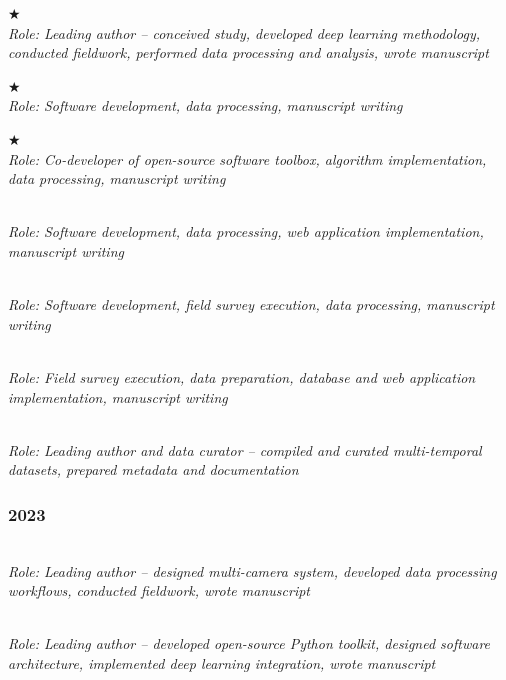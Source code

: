 \documentclass[11pt,a4paper]{article}
\newcommand{\starred}{\ensuremath{\bigstar}~}
\begin{document}
\noindent\starred{} \\
\textit{Role: Leading author -- conceived study, developed deep learning methodology, conducted fieldwork, performed data processing and analysis, wrote manuscript}

\vspace{8pt}
\noindent\starred{} \\
\textit{Role: Software development, data processing, manuscript writing}

\vspace{8pt}
\noindent\starred{} \\
\textit{Role: Co-developer of open-source software toolbox, algorithm implementation, data processing, manuscript writing}

\vspace{8pt}
\noindent{} \\
\textit{Role: Software development, data processing, web application implementation, manuscript writing}

\vspace{8pt}
\noindent{} \\
\textit{Role: Software development, field survey execution, data processing, manuscript writing}

\vspace{8pt}
\noindent{} \\
\textit{Role: Field survey execution, data preparation, database and web application implementation, manuscript writing}

\vspace{8pt}
\noindent{} \\
\textit{Role: Leading author and data curator -- compiled and curated multi-temporal datasets, prepared metadata and documentation}

\subsubsection*{2023}

\noindent{} \\
\textit{Role: Leading author -- designed multi-camera system, developed data processing workflows, conducted fieldwork, wrote manuscript}

\vspace{8pt}
\noindent{} \\
\textit{Role: Leading author -- developed open-source Python toolkit, designed software architecture, implemented deep learning integration, wrote manuscript}
\end{document}
